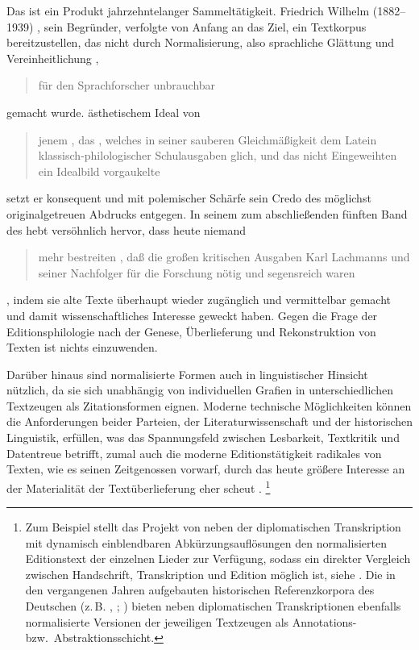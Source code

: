 Das \CAO{} ist ein Produkt jahrzehntelanger Sammeltätigkeit. Friedrich
Wilhelm\nocite{wilhelm1932} (1882--1939)%
, sein Begründer, verfolgte von Anfang an das Ziel, ein Textkorpus
bereitzustellen, das nicht durch Normalisierung, also sprachliche Glättung und
Vereinheitlichung \autocites[vgl.][76--84]{bein2011}{kragl2015},
\blockcquote[\RN{60}]{wilhelm1932}{für den Sprachforscher unbrauchbar} gemacht
wurde.  ästhetischem Ideal von
\blockcquote[\RN{3}]{wilhelm1932}{jenem , das
 \textelp{}, welches in seiner
sauberen Gleichmäßigkeit dem Latein klassisch-philologischer Schulausgaben
glich, und das \textelp{} nicht Eingeweihten ein Idealbild vorgaukelte} setzt
er konsequent und mit polemischer Schärfe sein Credo des möglichst
originalgetreuen Abdrucks entgegen.
In seinem  zum abschließenden fünften Band des
\CAO{} hebt \citeauthor{deboor1976} versöhnlich hervor, dass heute
niemand \blockcquote[\RN{13}]{deboor1976}{mehr bestreiten , daß
die großen kritischen Ausgaben Karl Lachmanns und seiner Nachfolger für die
Forschung nötig und segensreich waren}, indem sie alte Texte überhaupt wieder
zugänglich und vermittelbar gemacht und damit wissenschaftliches Interesse
geweckt haben. Gegen die Frage der Editionsphilologie nach der Genese,
Überlieferung und Rekonstruktion von Texten ist nichts einzuwenden.

Darüber hinaus sind normalisierte Formen auch in linguistischer Hinsicht
nützlich, da sie sich unabhängig von individuellen Grafien in
unterschiedlichen Textzeugen als Zitations\-formen eignen. Moderne technische
Möglich\-keiten können die Anforderungen beider Parteien, der
Literaturwissenschaft und der historischen Linguistik, erfüllen, was das
Spannungsfeld zwischen Lesbarkeit, Textkritik und Datentreue betrifft, zumal
auch die moderne Editionstätigkeit radikales  von Texten, wie
\citeauthor{wilhelm1932} es seinen Zeitgenossen vorwarf, durch das heute
größere Interesse an der Materialität der Textüberlieferung eher scheut
\autocite[vgl.][1306]{wegera2000}.%
%
	\footnote{Zum Beispiel stellt das Projekt  von
	\citet{ldmdigital} neben der diplomatischen Transkription mit dynamisch
	einblendbaren Abkürzungsauflösungen den normalisierten Editionstext der
	einzelnen Lieder zur Verfügung, sodass ein direkter Vergleich zwischen
	Handschrift, Transkription und Edition möglich ist, siehe
	. Die in den vergangenen Jahren aufgebauten
	historischen Referenzkorpora des Deutschen
	(z.\,B. \cite{ddd}, \cite{rem}; \cite[vgl.][522--523]{dipper2015}) bieten neben
	diplomatischen Transkriptionen ebenfalls normalisierte Versionen der
	jeweiligen Textzeugen als Annotations- bzw.\ Abstraktionsschicht.}

